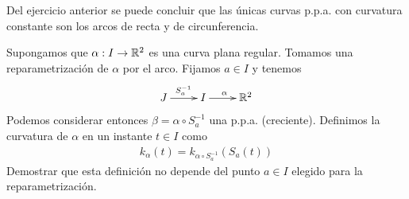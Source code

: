 \begin{observacion}
    Del ejercicio anterior se puede concluir que las únicas curvas p.p.a. con curvatura constante son los arcos de recta y de circunferencia.
\end{observacion}

\begin{ejercicio}
    Supongamos que $\alpha:I\to \mathbb{R}^2$ es una curva plana regular. Tomamos una reparametrización de $\alpha$ por el arco. Fijamos $a\in I$ y tenemos
    \begin{gather*}
        \xymatrix{
            J  \ar[r]^{S_a^{-1}} & I \ar[r]^\alpha &\bb{R}^2 
        }
    \end{gather*}
    Podemos considerar entonces $\beta = \alpha \circ S_a^{-1}$ una p.p.a. (creciente). Definimos la curvatura de $\alpha$ en un instante $t\in I$ como 
    \begin{gather*}
        k_\alpha(t) = k_{\alpha \circ S_a^{-1}}(S_a(t))
    \end{gather*}
    Demostrar que esta definición no depende del punto $a\in I$ elegido para la reparametrización.\\


\end{ejercicio}
